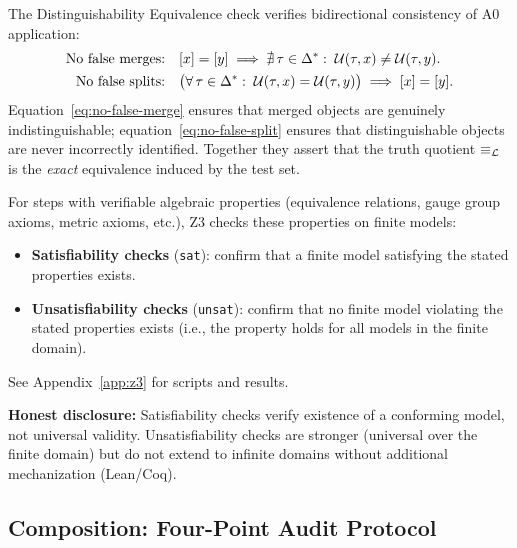 \begin{definition}
\label{def:de}
The Distinguishability Equivalence check verifies bidirectional
consistency of A0 application:
\begin{align}
  \text{No false merges:}\quad &
    [x] = [y] \;\Longrightarrow\;
    \nexists\, \tau \in \Delta^*:\; \mathcal{U}(\tau, x) \neq \mathcal{U}(\tau, y).
    \label{eq:no-false-merge} \\
  \text{No false splits:}\quad &
    \bigl(\forall\, \tau \in \Delta^*:\; \mathcal{U}(\tau, x) = \mathcal{U}(\tau, y)\bigr)
    \;\Longrightarrow\; [x] = [y].
    \label{eq:no-false-split}
\end{align}
Equation~\eqref{eq:no-false-merge} ensures that merged objects are
genuinely indistinguishable; equation~\eqref{eq:no-false-split} ensures
that distinguishable objects are never incorrectly identified.  Together
they assert that the truth quotient $\equiv_{\mathcal{L}}$ is the \emph{exact}
equivalence induced by the test set.
\end{definition}

\begin{definition}
\label{def:z3}
For steps with verifiable algebraic properties (equivalence relations,
gauge group axioms, metric axioms, etc.), Z3 \citep{demoura2008} checks
these properties on finite models:
\begin{itemize}[nosep]
  \item \textbf{Satisfiability checks} (\texttt{sat}): confirm that a
        finite model satisfying the stated properties exists.
  \item \textbf{Unsatisfiability checks} (\texttt{unsat}): confirm that
        no finite model violating the stated properties exists (i.e., the
        property holds for all models in the finite domain).
\end{itemize}
See Appendix~\ref{app:z3} for scripts and results.

\textbf{Honest disclosure:} Satisfiability checks verify existence of a
conforming model, not universal validity.  Unsatisfiability checks are
stronger (universal over the finite domain) but do not extend to
infinite domains without additional mechanization (Lean/Coq).
\end{definition}

\subsection{Composition: Four-Point Audit Protocol}

